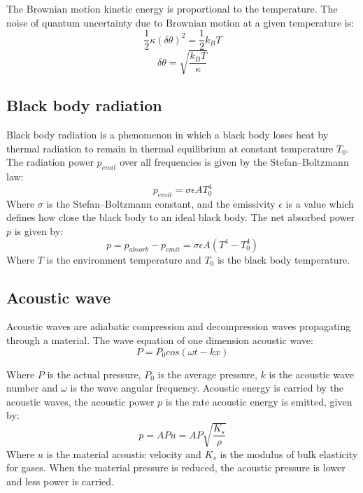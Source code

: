 \documentclass[\main/master.tex]{subfiles}
\begin{document}
The Brownian motion kinetic energy is proportional to the temperature. The noise of quantum uncertainty due to Brownian motion at a given temperature is: 
\begin{equation}
\frac{1}{2}\kappa (\delta\theta)^2= \frac{1}{2}k_BT  \label{eqn:Brownian uncertainty}
\end{equation}
\begin{equation}
\delta\theta = \sqrt{\frac{k_B T}{\kappa}}  \label{eqn:Brownian uncertainty 2}
\end{equation}
\fi
\subsection{Black body radiation}
Black body radiation is a phenomenon in which a black body loses heat by thermal radiation to remain in thermal equilibrium at constant temperature $T_0$. The  radiation power $p_{emit}$ over all frequencies is given by the Stefan–Boltzmann law:
\begin{equation}
p_{emit} = \sigma\epsilon A T_0^4  \label{eqn: Stefan–Boltzmann law}
\end{equation}
Where $\sigma$ is the Stefan–Boltzmann constant, and the emissivity $\epsilon$ is a value which defines how close the black body to an ideal black body. The net absorbed power $p$ is given by: 
\begin{equation}
p = p_{absorb}-p_{emit} = \sigma\epsilon A (T^4-T_0^4)  \label{eqn: Stefan–Boltzmann power}
\end{equation}
Where $T$ is the environment temperature and $T_0$ is the black body temperature.  
\subsection{Acoustic wave}
Acoustic waves are adiabatic compression and decompression waves propagating through a material. The wave equation of one dimension acoustic wave:
\begin{equation}
P = P_0 cos(\omega t -k x)       \label{eqn:acoustic_pressure}
\end{equation}
\par\noindent
Where $P$ is the actual pressure, $P_0$ is the average pressure, $k$ is the acoustic wave number and $\omega$ is the wave angular frequency. Acoustic energy is carried by the acoustic waves, the acoustic power $p$ is the rate acoustic energy is emitted, given by:
\begin{equation}
p = AP u  = A P\sqrt{\frac{K_s}{\rho}}     \label{eqn:acoustic_intensity}
\end{equation}
Where $u$ is the material acoustic velocity and $K_s$ is the modulus of bulk elasticity for gases. When the material pressure is reduced, the acoustic pressure is lower and less power is carried.
\end{document}
